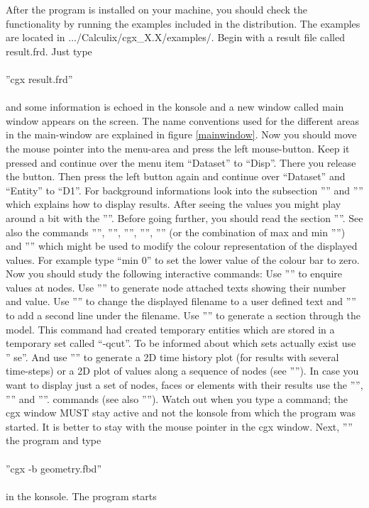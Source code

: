 \documentclass{article}
\begin{document}
After the program is installed on your machine, you should check the functionality by running the examples included in the distribution. The examples are located in .../Calculix/cgx\_X.X/examples/. Begin with a result file called result.frd. Just type\\\\  ''cgx result.frd''\\\\and some information is echoed in the konsole and a new window called main window appears on the screen. The name conventions used for the different areas in the main-window are explained in figure \ref{mainwindow}. Now you should move the mouse pointer into the menu-area and press the left mouse-button. Keep it pressed and continue over the menu item ``Dataset'' to ``Disp''. There you release the button. Then press the left button again and continue over ``Dataset'' and ``Entity'' to ``D1''. For background informations look into the subsection '''' and '''' which explains how to display results. After seeing the values you might play around a bit with the ''''. Before going further, you should read the section ''''. See also the commands '''', '''', '''', '''', '''' (or the combination of max and min '''') and '''' which might be used to modify the colour representation of the displayed values. For example type ``min 0'' to set the lower value of the colour bar to zero. Now you should study the following interactive commands: Use '''' to enquire values at nodes. Use '''' to generate node attached texts showing their number and value. Use '''' to change the displayed filename to a user defined text and '''' to add a second line under the filename. Use '''' to generate a section through the model. This command had created temporary entities which are stored in a temporary set called ``-qcut''. To be informed about which sets actually exist use '' se''. And use '''' to generate a 2D time history plot (for results with several time-steps) or a 2D plot of values along a sequence of nodes (see ''''). In case you want to display just a set of nodes, faces or elements with their results use the '''', '''' and ''''. commands (see also '''').  Watch out when you type a command; the cgx window MUST stay active and not the konsole from which the program was started. It is better to stay with the mouse pointer in the cgx window. Next, '''' the program and type\\\\  ''cgx -b geometry.fbd''\\\\in the konsole. The program starts 
\end{document}
